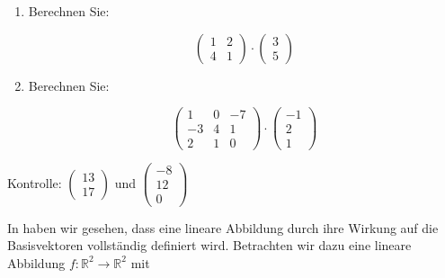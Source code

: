 \clearpage
\begin{ueb}
    {}{}
    \begin{enumerate}
        \item Berechnen Sie:

        \[
        \begin{pmatrix} 1 & 2 \\ 4 & 1 \end{pmatrix}
        \cdot
        \begin{pmatrix} 3 \\ 5 \end{pmatrix}
        \]
        \item Berechnen Sie:

        \[
        \begin{pmatrix} 1 & 0 & -7 \\ -3 & 4 & 1 \\ 2 & 1 & 0 \end{pmatrix}
        \cdot
        \begin{pmatrix} -1 \\ 2 \\ 1 \end{pmatrix}
        \]
    \end{enumerate}

    Kontrolle: $\begin{pmatrix} 13 \\ 17 \end{pmatrix}$ und $\begin{pmatrix} -8 \\ 12 \\ 0 \end{pmatrix}$
\end{ueb}

In  haben wir gesehen, dass eine lineare Abbildung durch ihre Wirkung auf die Basisvektoren vollständig definiert wird. Betrachten wir dazu eine lineare Abbildung 
\( f: \mathbb{R}^2 \to \mathbb{R}^2 \) mit 



